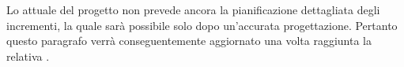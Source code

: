 Lo  attuale del progetto non prevede ancora la pianificazione dettagliata degli incrementi, la quale sarà possibile solo dopo un'accurata progettazione. Pertanto questo paragrafo verrà conseguentemente aggiornato una volta raggiunta la relativa .